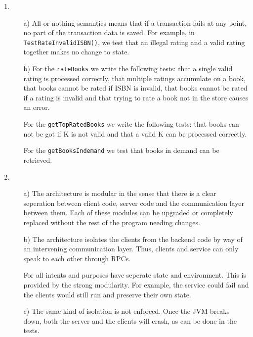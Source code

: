 \documentclass[11pt]{article}
\begin{document}
\begin{enumerate}
  \item
    \begin{itemize}
      \item[a)]
        All-or-nothing semantics means that if a transaction fails at any
        point, no part of the transaction data is saved. For example, in
				\verb|TestRateInvalidISBN()|, we test that an illegal rating and a
				valid rating together makes no change to state.

      \item[b)]
        For the \texttt{rateBooks} we write the following tests: that a
        single valid rating is processed correctly, that multiple ratings
        accumulate on a book, that books cannot be rated if ISBN is
        invalid, that books cannot be rated if a rating is invalid and
        that trying to rate a book not in the store causes an error.

        For the \texttt{getTopRatedBooks} we write the following tests:
        that books can not be got if K is not valid and that a valid K can
        be processed correctly.

        For the \texttt{getBooksIndemand} we test that books in demand can be
        retrieved.
    \end{itemize}
  \item

\begin{itemize}
      \item[a)]
				The architecture is modular in the sense that there is a clear
        seperation between client code, server code and the communication layer
        between them. Each of these modules can be upgraded or completely
        replaced without the rest of the program needing changes.

      \item[b)]
        The architecture isolates the clients from the backend code by way of
        an intervening communication layer. Thus, clients and service can only
        speak to each other through RPCs.
        
        For all intents and purposes have seperate state and environment. This
        is provided by the strong modularity. For example, the service could
        fail and the clients would still run and preserve their own state.

      \item[c)]
        The same kind of isolation is not enforced. Once the JVM breaks down,
        both the server and the clients will crash, as can be done in the tests.


\end{itemize}
\end{enumerate}
\end{document}
